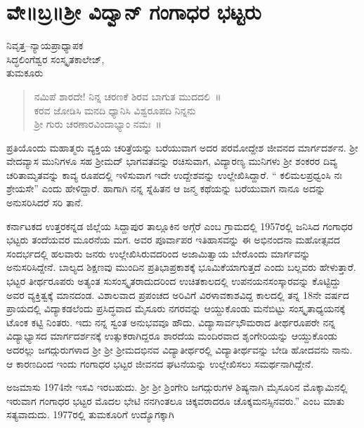 \chapter{ವೇ॥ಬ್ರ॥ಶ್ರೀ ವಿದ್ವಾನ್ ಗಂಗಾಧರ ಭಟ್ಟರು}

\begin{center}
\smallskip
ನಿವೃತ್ತ–ನ್ಯಾಯಪ್ರಾಧ್ಯಾಪಕ\\
ಸಿದ್ಧಲಿಂಗೆಶ್ವರ ಸಂಸ್ಕೃತಕಾಲೇಜ್,\\
ತುಮಕೂರು
\addrule
\end{center}
\begin{verse}
ನಮಿಪೆ ಶಾರದೇ! ನಿನ್ನ ಚರಣಕೆ ಶಿರವ ಬಾಗುತ ಮುದದಲಿ~॥\\
ಕರವ ಜೋಡಿಸಿ ಮನದಿ ಧ್ಯಾನಿಸಿ ವಿಶ್ವರೂಪದಿ ನಿನ್ನನು\\
ಶ್ರೀ ಗುರು ಚರಣಾರವಿಂದಾಭ್ಯಾಂ ನಮಃ~॥
\end{verse}

ಪ್ರತಿಯೊಂದು ಮಹಾತ್ಮರು ವ್ಯಕ್ತಿಯ ಚರಿತ್ರೆಯನ್ನು ಬರೆಯುವಾಗ ಅದರ ಪರಮೋದ್ದೇಶ ಜೀವನದ ಮಾರ್ಗದರ್ಶನ. ಶ್ರೀ ವೇದವ್ಯಾಸ ಮುನಿಗಳೂ ಸಹ ಶ್ರೀಮದ್ ಭಾಗವತವನ್ನು ರಚಿಸುವಾಗ, ವಿದ್ಯಾರಣ್ಯ ಮುನಿಗಳು ಶ್ರೀ ಶಂಕರರ ದಿವ್ಯ ಚರಿತಾಮೃತವನ್ನು ಕಾವ್ಯ ರೂಪದಲ್ಲಿ ಇಳಿಸುವಾಗ ಇದೇ ಉದ್ದೇಶವನ್ನು ಉಲ್ಲೇಖಿಸಿದ್ದಾರೆ. “ ಕಲಿಮಲಪ್ರಧ್ವಂಸಿ ನಃ ಶ್ರೇಯಸೇ” ಎಂದು ಹೇಳಿದ್ದಾರೆ. ಹಾಗಾಗಿ ನನ್ನ ಸ್ನೆಹಿತನ ಆ ಜನ್ಮ ಕಥೆಯನ್ನು ಬರೆಯುವಾಗ ನಾನೂ ಅದನ್ನು ಅನುಸರಿಸಿದರೆ ಸರಿ ತಾನೆ.

ಕರ್ನಾಟಕದ ಉತ್ತರಕನ್ನಡ ಜಿಲ್ಲೆಯ ಸಿದ್ದಾಪುರ ತಾಲ್ಲೂಕಿನ ಅಗ್ಗೆರೆ ಎಂಬ ಗ್ರಾಮದಲ್ಲಿ 1957ರಲ್ಲಿ ಜನಿಸಿದ ಗಂಗಾಧರ ಭಟ್ಟರು ತಂದೆಯವರ ಮೂರನೆಯ ಮಗ. ಅವರ ಪೂರ್ವಾಪರ ಇತಿಹಾಸವನ್ನು ಈ ಅಭಿನಂದನಾ ಮಹೋತ್ಸವದ ಸಂದರ್ಭದಲ್ಲಿ  ಹಲವಾರು ಜನರು ಉಲ್ಲೇಖಿಸಿರುವದರಿಂದ ಅಜಾಮಿತ್ವಾಯ ಬೇರೊಂದು ಮಾರ್ಗವನ್ನು ಅನುಸರಿಸಿದ್ದೇನೆ. ಬಾಲ್ಯದ ಶಿಕ್ಷಣವು ಮುಂದಿನ ಪ್ರತಿಭಾಪ್ರಕಾಶಕ್ಕೆ ಭೂಮಿಕೆಯಾಗುತ್ತದೆ ಎಂದು ಬಲ್ಲವರು ಹೇಳುತ್ತಾರೆ. ಭಟ್ಟರ ತೀರ್ಥರೂಪರು ಅತ್ಯಂತ ಸುಸಂಸ್ಕೃತರಾದುದರಿಂದ ಉಚಿತಕಾಲದಲ್ಲಿ ಉಪನಯನಸಂಸ್ಕಾರವನ್ನು ಕೊಟ್ಟಿದ್ದು ಅವರ ವ್ಯಕ್ತಿತ್ವಕ್ಕೆ ಮಾನದಂಡ. ವಿಶಾಲವಾದ ಪ್ರಪಂಚದ ಅರಿವಿಗೆ ವಿರಳಾವಕಾಶವಿದ್ದ ಕಾಲದಲ್ಲಿ ತನ್ನ 18ನೇ ವರ್ಷದ ಪ್ರಾಯದಲ್ಲಿ ವಿದ್ಯಾಕಡಲೆಂದು ಪ್ರಸಿದ್ಧವಾದ ಮೈಸೂರು ನಗರವನ್ನು ಆಯ್ದುಕೊಂಡು ಮನೆಬಿಟ್ಟು ಸಂಸ್ಕೃತಾಧ್ಯಯನಕ್ಕೆ ಟೊಂಕ ಕಟ್ಟಿ ನಿಂತರು. ಇದು ನನ್ನ ಸ್ವಂತ ಅನುಭವವೂ ಹೌದು. ವಿದ್ಯಾಸಾರ್ವಭೌಮರಾದ ತೀರ್ಥರೂಪರೇ ನನ್ನ ವಿದ್ಯಾಭ್ಯಾಸದ ಮಾರ್ಗದರ್ಶನಕ್ಕೆ ಉತ್ಸುಕರಾಗಿದ್ದರೂ ಶಾರದೆಯ ಮಂದಿರವಾದ ಶೃಂಗೇರಿಯನ್ನು ಆಯ್ದುಕೊಂಡು ಅದರಲ್ಲು ಜಗದ್ಗುರುಗಳಾದ ಶ್ರೀ ಶ್ರೀ ಶ್ರೀಮದಭಿನವ ವಿದ್ಯಾತೀರ್ಥರಲ್ಲಿ ವಿದ್ಯಾತೀರ್ಥವನ್ನು ಬೇಡಿ ಹೋದವನು ನಾನು. ಆ ಕಾರಣದಿಂದ ಇಂದು ಗಂಗಾಧರ ಭಟ್ಟರ ಜೀವನದ ಘಟನೆಯನ್ನು ಉಲ್ಲೇಖಿಸಲು ಸಮರ್ಥನಾಗಿದ್ದೇನೆ.

ಅಜಮಾಸು 1974ನೇ ಇಸವಿ ಇರಬಹುದು. ಶ್ರೀ ಶ್ರೀ ಶ್ರಿಂಗೇರಿ ಜಗದ್ಗುರುಗಳ ಶಿಷ್ಯನಾಗಿ ಮೈಸೂರಿನ ಮೊಕ್ಕಾಮಿನಲ್ಲಿ ಇರುವಾಗ ಗಂಗಾಧರ ಭಟ್ಟರ ಮೊದಲ ಭೇಟಿ ನನಗಿಂತಲೂ ಚಿಕ್ಕವರಾದರೂ ಚೊಕ್ಕಮನಸ್ಸಿನವರು.”  ಎಂಬ ಮಾತು ಸತ್ಯವಾದುದು. 1977ರಲ್ಲಿ ತುಮಕೂರಿಗೆ ಉದ್ಯೊಗಕ್ಕಾಗಿ


